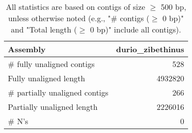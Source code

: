 \documentclass[12pt,a4paper]{article}
\begin{document}
\begin{table}[ht]
\begin{center}
\caption{All statistics are based on contigs of size $\geq$ 500 bp, unless otherwise noted (e.g., "\# contigs ($\geq$ 0 bp)" and "Total length ($\geq$ 0 bp)" include all contigs).}
\begin{tabular}{|l*{1}{|r}|}
\hline
Assembly & durio\_zibethinus \\ \hline
\# fully unaligned contigs & 528 \\ \hline
Fully unaligned length & 4932820 \\ \hline
\# partially unaligned contigs & 266 \\ \hline
Partially unaligned length & 2226016 \\ \hline
\# N's & 0 \\ \hline
\end{tabular}
\end{center}
\end{table}
\end{document}

